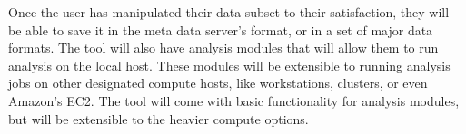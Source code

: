 Once the user has manipulated their data subset to their satisfaction, they
will be able to save it in the meta data server's format, or in a set of major
data formats. The tool will also have analysis modules that will allow them
to run analysis on the local host. These modules will be extensible to running 
analysis jobs on other designated compute hosts, like workstations, clusters,
or even Amazon's EC2. The tool will come with basic functionality for 
analysis modules, but will be extensible to the heavier compute options.


